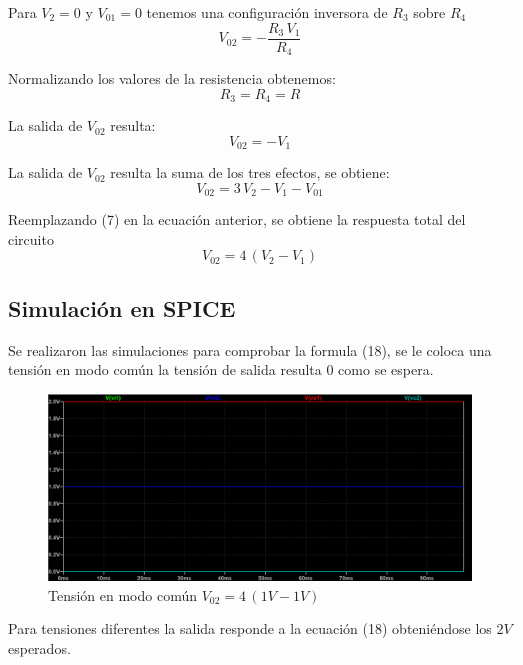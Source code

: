 \documentclass[12pt]{article}
\begin{document}
		Para $V_2=0$ y $V_{01}=0$  tenemos una configuración inversora de $R_3$ sobre $R_4$
		\begin{equation}
			V_{02}=-\frac{R_3 \,V_1 }{R_4 }
		\end{equation}
		
		Normalizando los valores de la resistencia obtenemos:
		\begin{equation}
			R_3=R_4=R 
		\end{equation}
		
		La salida de $V_{02}$ resulta:
		\begin{equation}
			V_{02}=-V_1
		\end{equation}
		
		La salida de $V_{02}$ resulta la suma de los tres efectos, se obtiene:
		\begin{equation}
			V_{02}=3\,V_2-V_1-V_{01}
		\end{equation}
		
		Reemplazando (7) en la ecuación anterior, se obtiene la respuesta total del circuito
		\begin{equation}
			V_{02}=4\,(V_2-V_1)
		\end{equation}
		
		\subsection{Simulación en SPICE}
		Se realizaron las simulaciones para comprobar la formula (18), se le coloca una tensión en modo común
		la tensión de salida resulta 0 como se espera.
		
		\begin{figure}[h!]
			\centering
			\includegraphics[width=1\linewidth]{Simulaciones-Resultados/Circuito1_Vo1(Vc)-Vo2(Vc)}
			\caption{Tensión en modo común $V_{02}=4\,(1V-1V)$}
			\label{fig:circuito1vo1vc-vo2vc}
		\end{figure} 
		
		Para tensiones diferentes la salida responde a la ecuación (18) obteniéndose los $2V$ esperados. 
		
\end{document}
